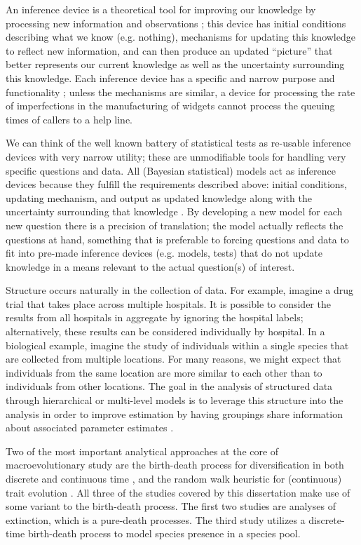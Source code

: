 An inference device is a theoretical tool for improving our knowledge by processing new information and observations \citep{McElreath2016,Jaynes2003a}; this device has initial conditions describing what we know (e.g. nothing), mechanisms for updating this knowledge to reflect new information, and can then produce an updated ``picture'' that better represents our current knowledge as well as the uncertainty surrounding this knowledge. Each inference device has a specific and narrow purpose and functionality \citep{McElreath2016}; unless the mechanisms are similar, a device for processing the rate of imperfections in the manufacturing of widgets cannot process the queuing times of callers to a help line.  

We can think of the well known battery of statistical tests \citep{Sokal2011} as re-usable inference devices with very narrow utility; these are unmodifiable tools for handling very specific questions and data. All (Bayesian statistical) models act as inference devices because they fulfill the requirements described above: initial conditions, updating mechanism, and output as updated knowledge along with the uncertainty surrounding that knowledge \citep{McElreath2016,Jaynes2003a}. By developing a new model for each new question there is a precision of translation; the model actually reflects the questions at hand, something that is preferable to forcing questions and data to fit into pre-made inference devices (e.g. models, tests) that do not update knowledge in a means relevant to the actual question(s) of interest.

Structure occurs naturally in the collection of data. For example, imagine a drug trial that takes place across multiple hospitals. It is possible to consider the results from all hospitals in aggregate by ignoring the hospital labels; alternatively, these results can be considered individually by hospital. In a biological example, imagine the study of individuals within a single species that are collected from multiple locations. For many reasons, we might expect that individuals from the same location are more similar to each other than to individuals from other locations. The goal in the analysis of structured data through hierarchical or multi-level models is to leverage this structure into the analysis in order to improve estimation by having groupings share information about associated parameter estimates \citep{Gelman2013d,McElreath2016}. 

Two of the most important analytical approaches at the core of macroevolutionary study are the birth-death process for diversification in both discrete and continuous time \citep{Raup1973,Raup1985,Nee1992,Nee1994a,Nee2001,Nee2006b,Stadler2013b}, and the random walk heuristic for (continuous) trait evolution \citep{Raup1974a,Felsenstein1985b,Bookstein1987b,Gingerich1993,Roopnarine2001a,Roopnarine2003b,Roopnarine1999,Sheets2001,Hunt2006a,Hunt2007a}. All three of the studies covered by this dissertation make use of some variant to the birth-death process. The first two studies are analyses of extinction, which is a pure-death processes. The third study utilizes a discrete-time birth-death process to model species presence in a species pool.

